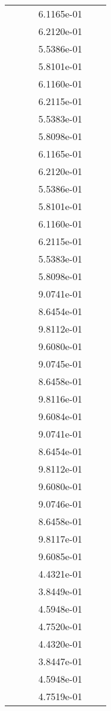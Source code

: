\begin{xltabular}{\textwidth}{r|rS[table-format=1.3e+2]S[table-format=1.4e+2]S[table-format=1.4e+2]S[table-format=-1.5]}
&  &  & 6.1165e-01 & & \\
&  &  & 6.2120e-01 & & \\
&  &  & 5.5386e-01 & & \\
&  &  & 5.8101e-01 & & \\
&  &  & 6.1160e-01 & & \\
&  &  & 6.2115e-01 & & \\
&  &  & 5.5383e-01 & & \\
&  &  & 5.8098e-01 & & \\
&  &  & 6.1165e-01 & & \\
&  &  & 6.2120e-01 & & \\
&  &  & 5.5386e-01 & & \\
&  &  & 5.8101e-01 & & \\
&  &  & 6.1160e-01 & & \\
&  &  & 6.2115e-01 & & \\
&  &  & 5.5383e-01 & & \\
&  &  & 5.8098e-01 & & \\
&  &  & 9.0741e-01 & & \\
&  &  & 8.6454e-01 & & \\
&  &  & 9.8112e-01 & & \\
&  &  & 9.6080e-01 & & \\
&  &  & 9.0745e-01 & & \\
&  &  & 8.6458e-01 & & \\
&  &  & 9.8116e-01 & & \\
&  &  & 9.6084e-01 & & \\
&  &  & 9.0741e-01 & & \\
&  &  & 8.6454e-01 & & \\
&  &  & 9.8112e-01 & & \\
&  &  & 9.6080e-01 & & \\
&  &  & 9.0746e-01 & & \\
&  &  & 8.6458e-01 & & \\
&  &  & 9.8117e-01 & & \\
&  &  & 9.6085e-01 & & \\
&  &  & 4.4321e-01 & & \\
&  &  & 3.8449e-01 & & \\
&  &  & 4.5948e-01 & & \\
&  &  & 4.7520e-01 & & \\
&  &  & 4.4320e-01 & & \\
&  &  & 3.8447e-01 & & \\
&  &  & 4.5948e-01 & & \\
&  &  & 4.7519e-01 & & \\

\end{xltabular}
